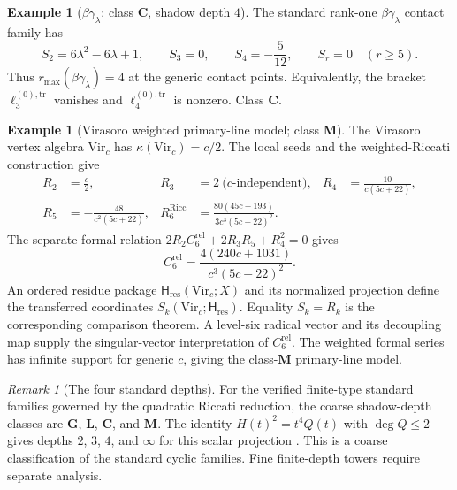 \documentclass[11pt,reqno]{amsart}
\theoremstyle{definition}
\newtheorem{example}[theorem]{Example}
\theoremstyle{remark}
\newtheorem{remark}[theorem]{Remark}
\providecommand{\Vir}{\mathrm{Vir}}
\numberwithin{equation}{section}
\begin{document}
\begin{example}[$\beta\gamma_\lambda$; class \textbf{C}, shadow
depth $4$]
The standard rank-one $\beta\gamma_\lambda$ contact family has
\[
S_2=6\lambda^2-6\lambda+1,\qquad
S_3=0,\qquad S_4=-\frac{5}{12},\qquad S_r=0\quad(r\ge5).
\]
Thus $r_{\max}(\beta\gamma_\lambda)=4$ at the generic contact
points. Equivalently, the bracket
$\ell_3^{(0),\mathrm{tr}}$ vanishes and
$\ell_4^{(0),\mathrm{tr}}$ is nonzero. Class $\textbf{C}$.
\end{example}

\begin{example}[Virasoro weighted primary-line model; class \textbf{M}]
The Virasoro vertex algebra $\Vir_c$ has $\kappa(\Vir_c)=c/2$.
The local seeds and the weighted-Riccati construction give
\begin{align*}
R_2&=\tfrac{c}{2},&
R_3&=2\ \text{(}c\text{-independent)},&
R_4&=\tfrac{10}{c(5c+22)},\\
R_5&=-\tfrac{48}{c^2(5c+22)},&
R_6^{\mathrm{Ricc}}&=\tfrac{80(45c+193)}{3c^3(5c+22)^2}.
\end{align*}
The separate formal relation
$2R_2C_6^{\mathrm{rel}}+2R_3R_5+R_4^2=0$ gives
\[
C_6^{\mathrm{rel}}=\frac{4(240c+1031)}{c^3(5c+22)^2}.
\]
An ordered residue package $\mathsf H_{\mathrm{res}}(\Vir_c;X)$ and
its normalized projection define the transferred coordinates
$S_k(\Vir_c;\mathsf H_{\mathrm{res}})$.  Equality
$S_k=R_k$ is the corresponding comparison theorem.  A level-six
radical vector and its decoupling map supply the singular-vector
interpretation of $C_6^{\mathrm{rel}}$.  The weighted formal series
has infinite support for generic $c$, giving the class-$\mathbf M$
primary-line model.
\end{example}

\begin{remark}[The four standard depths]
For the verified finite-type standard families governed by the
quadratic Riccati reduction, the coarse shadow-depth classes are
$\textbf{G}$, $\textbf{L}$, $\textbf{C}$, and $\textbf{M}$. The
identity $H(t)^2=t^4Q(t)$ with $\deg Q\le2$ gives depths
$2$, $3$, $4$, and $\infty$ for this scalar projection
\cite[theorem on Riccati algebraicity]{Lorgat26}. This is a
coarse classification of the standard cyclic families. Fine
finite-depth towers require separate analysis.
\end{remark}
\end{document}
